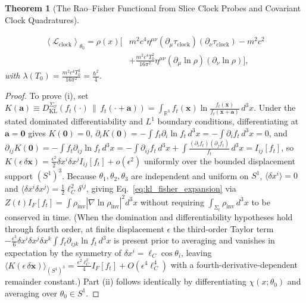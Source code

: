 \documentclass[11pt, a4paper]{article}
\newtheorem{theorem}{Theorem}[section]
\theoremstyle{definition}
\begin{document}
\begin{theorem}[The Rao--Fisher Functional from Slice Clock Probes and Covariant Clock Quadratures]
\begin{enumerate}[label=(\roman*)]
\begin{equation}
    \begin{aligned}
    \left\langle \mathcal{L}_{\text{clock}} \right\rangle_{\theta_0} = \rho(x)\bigg[ &m^2 c^4 \eta^{\mu\nu}(\partial_\mu \tau_{\text{clock}})(\partial_\nu \tau_{\text{clock}}) - m^2 c^2 \\
    &+ \frac{m^2 c^4 T_0^2}{16\pi^2} \eta^{\mu\nu}(\partial_\mu \ln\rho)(\partial_\nu \ln\rho) \bigg],
    \end{aligned}
    \end{equation}
    with $\lambda(T_0) = \frac{m^2 c^4 T_0^2}{16\pi^2} = \frac{\hbar^2}{4}$.
\end{enumerate}
\end{theorem}

\begin{proof}
To prove (i), set $K(\mathbf{a}) \equiv D_{\text{KL}}^{\Sigma_{\mathcal{O}}}(f_t(\cdot)\,\|\,f_t(\cdot+\mathbf{a})) = \int_{\mathbb{R}^3} f_t(\mathbf{x})\ln\frac{f_t(\mathbf{x})}{f_t(\mathbf{x}+\mathbf{a})}\,d^3x$. Under the stated dominated differentiability and $L^1$ boundary conditions, differentiating at $\mathbf{a} = \mathbf{0}$ gives $K(\mathbf{0}) = 0$, $\partial_i K(\mathbf{0}) = -\int f_t \partial_i\ln f_t\,d^3x = -\int\partial_i f_t\,d^3x = 0$, and $\partial_{ij}K(\mathbf{0}) = -\int f_t \partial_{ij}\ln f_t\,d^3x = -\int\partial_{ij}f_t\,d^3x + \int \frac{(\partial_i f_t)(\partial_j f_t)}{f_t}\,d^3x = I_{ij}[f_t]$, so $K(\epsilon\,\delta\mathbf{x}) = \frac{\epsilon^2}{2}\delta x^i \delta x^j I_{ij}[f_t] + o(\epsilon^2)$ uniformly over the bounded displacement support $(S^1)^3$. Because $\theta_1, \theta_2, \theta_3$ are independent and uniform on $S^1$, $\langle \delta x^i \rangle = 0$ and $\langle \delta x^i \delta x^j \rangle = \frac{1}{2}\ell_C^2 \delta^{ij}$, giving Eq.~\eqref{eq:kl_fisher_expansion} via $Z(t)I_F[f_t] = \int \rho_{\text{inv}}|\nabla\ln\rho_{\text{inv}}|^2 d^3x$ without requiring $\int_{\Sigma_t}\rho_{\text{inv}}\,d^3x$ to be conserved in time. (When the domination and differentiability hypotheses hold through fourth order, at finite displacement $\epsilon$ the third-order Taylor term $-\frac{\epsilon^3}{6}\delta x^i\delta x^j\delta x^k \int f_t \partial_{ijk}\ln f_t\,d^3x$ is present prior to averaging and vanishes in expectation by the symmetry of $\delta x^i = \ell_C\cos\theta_i$, leaving $\langle K(\epsilon\,\delta\mathbf{x}) \rangle_{(S^1)^3} = \frac{\epsilon^2\ell_C^2}{4}I_F[f_t] + O(\epsilon^4 \ell_C^4)$ with a fourth-derivative-dependent remainder constant.) Part (ii) follows identically by differentiating $\chi(x; \theta_0)$ and averaging over $\theta_0 \in S^1$.
\end{proof}
\end{document}

